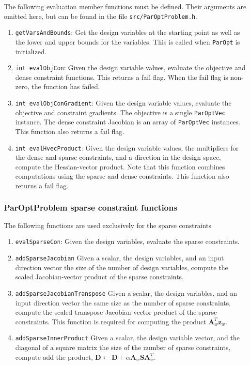 \documentclass[12pt]{article}
\newcommand{\mb}{\mathbf}
\begin{document}
The following evaluation member functions must be defined. Their arguments are omitted here, but can be found
in the file \texttt{src/ParOptProblem.h}.
\begin{enumerate}
\item \texttt{getVarsAndBounds}: Get the design variables at the starting point as well as the lower and upper bounds for the variables. This is called when \texttt{ParOpt} is initialized. 

\item \texttt{int evalObjCon}: Given the design variable values, evaluate the objective and dense constraint functions. This returns a fail flag. When the fail flag is non-zero, the function has failed.

\item \texttt{int evalObjConGradient}: Given the design variable values, evaluate the objective and constraint gradients. The objective is a single \texttt{ParOptVec} instance. The dense constraint Jacobian is an array of \texttt{ParOptVec} instances. This function also returns a fail flag. 

\item \texttt{int evalHvecProduct}: Given the design variable values, the multipliers for the dense and sparse constraints, and a direction in the design space, compute the Hessian-vector product. Note that this function combines computations using the sparse and dense constraints. This function also returns a fail flag.
\end{enumerate}

\subsubsection{ParOptProblem sparse constraint functions}

The following functions are used exclusively for the sparse constraints
%
\begin{enumerate}
\item \texttt{evalSparseCon}: Given the design variables, evaluate the sparse constraints.

\item \texttt{addSparseJacobian} Given a scalar, the design variables, and an input direction vector the size of the number of design variables, compute the scaled Jacobian-vector product of the sparse constraints.

\item \texttt{addSparseJacobianTranspose} Given a scalar, the design variables, and an input direction vector the same size as the number of sparse constraints, compute the scaled transpose Jacobian-vector product of the sparse constraints. This function is required for computing the product $\mb{A}_{w}^{T}\mb{z}_{w}$.

\item \texttt{addSparseInnerProduct} Given a scalar, the design variable vector, and the diagonal of a square matrix the size of the number of sparse constraints, compute add the product, $\mb{D} \leftarrow \mb{D} + \alpha \mb{A}_{w} \mb{S}\mb{A}_{w}^{T}$.
\end{enumerate}
\end{document}
